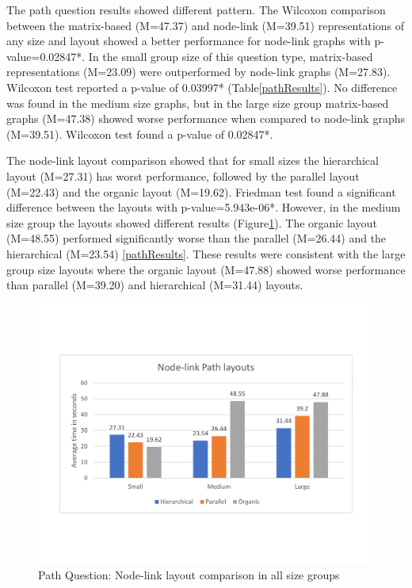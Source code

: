 \documentclass{l4proj}
\begin{document}
The path question results showed different pattern. The Wilcoxon comparison between the matrix-based (M=47.37) and node-link (M=39.51) representations of any size and layout showed a better performance for node-link graphs with p-value=0.02847*. In the small group size of this question type, matrix-based representations (M=23.09) were outperformed by node-link graphs (M=27.83). Wilcoxon test reported a p-value of 0.03997* (Table\ref{pathResults}). No difference was found in the medium size graphs, but in the large size group matrix-based graphs (M=47.38) showed worse performance when compared to node-link graphs (M=39.51). Wilcoxon test found a p-value of 0.02847*. 

The node-link layout comparison showed that for small sizes the hierarchical layout (M=27.31) has worst performance, followed by the parallel layout (M=22.43) and the organic layout (M=19.62). Friedman test found a significant difference between the layouts with p-value=5.943e-06*. However, in the medium size group the layouts showed different results (Figure\ref{nodePathLayouts}). The organic layout (M=48.55) performed significantly worse than the parallel (M=26.44) and the hierarchical (M=23.54) \ref{pathResults}. These results were consistent with the large group size layouts where the organic layout (M=47.88) showed worse performance than parallel (M=39.20) and hierarchical (M=31.44) layouts.


\begin{figure}[H]
\centering
\includegraphics[width=15cm]{nodePathLayouts.pdf}
\caption{Path Question: Node-link layout comparison in all size groups}
\label{nodePathLayouts}
\end{figure}
\end{document}
